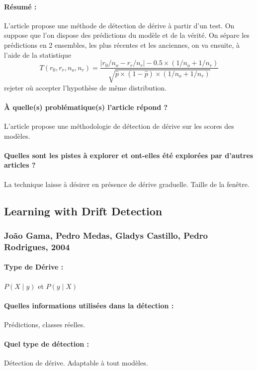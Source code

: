 \documentclass[11pt,a4paper]{report}
\begin{document}
\paragraph{Résumé :} L'article propose une méthode de détection de dérive à partir d'un test. On suppose que l'on dispose des prédictions du modèle et de la vérité. On sépare les prédictions en 2 ensembles, les plus récentes et les anciennes, on va ensuite, à l'aide de la statistique $$T\left(r_{0}, r_{r}, n_{o}, n_{r}\right)=\frac{\left|r_{0} / n_{o}-r_{r} / n_{r}\right|-0.5 \times\left(1 / n_{o}+1 / n_{r}\right)}{\sqrt{\hat{p} \times(1-\hat{p}) \times\left(1 / n_{o}+1 / n_{r}\right)}}$$ rejeter où accepter l'hypothèse de même distribution. 

\paragraph{À quelle(s) problématique(s) l'article répond ?} L'article propose une méthodologie de détection de dérive sur les scores des modèles.

\paragraph{Quelles sont les pistes à explorer et ont-elles été explorées par d'autres articles ?} La technique laisse à désirer en présence de dérive graduelle. Taille de la fenêtre.




\subsection{Learning with Drift Detection}
\subsubsection{João Gama, Pedro Medas, Gladys Castillo, Pedro Rodrigues, 2004}

\paragraph{Type de Dérive :} $P(X\mid y)$ et $P(y \mid X)$
\paragraph{Quelles informations utilisées dans la détection :} Prédictions, classes réelles.
\paragraph{Quel type de détection :} Détection de dérive. Adaptable à tout modèles.
\end{document}
